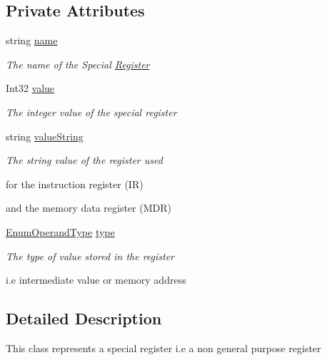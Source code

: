 \subsection*{Private Attributes}
\begin{DoxyCompactItemize}
\item 
string \hyperlink{class_c_p_u___o_s___simulator_1_1_c_p_u_1_1_special_register_ac521aef66f5fe6a88486e70f5ade8326}{name}
\begin{DoxyCompactList}\small\item\em The name of the Special \hyperlink{class_c_p_u___o_s___simulator_1_1_c_p_u_1_1_register}{Register} \end{DoxyCompactList}\item 
Int32 \hyperlink{class_c_p_u___o_s___simulator_1_1_c_p_u_1_1_special_register_a90d144e675bb3fe7bbc1f75bafdfde36}{value}
\begin{DoxyCompactList}\small\item\em The integer value of the special register \end{DoxyCompactList}\item 
string \hyperlink{class_c_p_u___o_s___simulator_1_1_c_p_u_1_1_special_register_a540a55b17a53591312e76689d051abac}{value\+String}
\begin{DoxyCompactList}\small\item\em The string value of the register used 

for the instruction register (I\+R) 

and the memory data register (M\+D\+R) \end{DoxyCompactList}\item 
\hyperlink{namespace_c_p_u___o_s___simulator_1_1_c_p_u_ad49cfe442b74115a326c03b7ae848f76}{Enum\+Operand\+Type} \hyperlink{class_c_p_u___o_s___simulator_1_1_c_p_u_1_1_special_register_aae2bca6c1354013cca156bd19c30640d}{type}
\begin{DoxyCompactList}\small\item\em The type of value stored in the register 

i.\+e intermediate value or memory address \end{DoxyCompactList}\end{DoxyCompactItemize}


\subsection{Detailed Description}
This class represents a special register i.\+e a non general purpose register 



